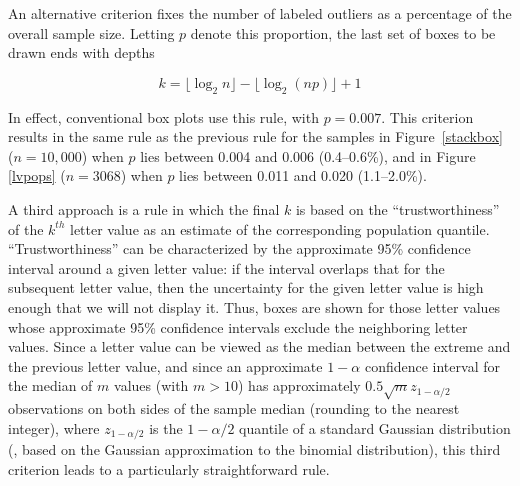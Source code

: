 \documentclass[oneside]{article}
\begin{document}
An alternative criterion fixes the number of labeled outliers as a percentage of the overall sample size. Letting $p$ denote this proportion, the last set of boxes to be drawn ends with depths

\begin{equation}
k = \lfloor \log_2 n \rfloor - \lfloor \log_2 (np) \rfloor + 1
\end{equation}

\noindent In effect, conventional box plots use this rule, with $p = 0.007$. This criterion results in the same rule as the previous rule for the samples in Figure~\ref{stackbox} ($n = 10,000$) when $p$ lies between 0.004 and 0.006 (0.4--0.6\%), and in Figure \ref{lvpops} ($n = 3068$) when $p$ lies between 0.011 and 0.020 (1.1--2.0\%).

A third approach is a rule in which the final $k$ is based on the ``trustworthiness'' of the $k^{th}$ letter value as an estimate of the corresponding population quantile. ``Trustworthiness'' can be characterized by the approximate 95\% confidence interval around a given letter value: if the interval overlaps that for the subsequent letter value, then the uncertainty for the given letter value is high enough that we will not display it. Thus, boxes are shown for those letter values whose approximate 95\% confidence intervals exclude the neighboring letter values. Since a letter value can be viewed as the median between the extreme and the previous letter value, and since an approximate $1-\alpha$ confidence interval for the median of $m$ values (with $m > 10$) has approximately $0.5 \sqrt{m} z_{1-\alpha/2}$ observations on both sides of the sample median (rounding to the nearest integer), where $z_{1-\alpha/2}$ is the ${1-\alpha/2}$ quantile of a standard Gaussian distribution (\citet[161]{ha.order}, based on the Gaussian approximation to the binomial distribution), this third criterion leads to a particularly straightforward rule.

\end{document}
